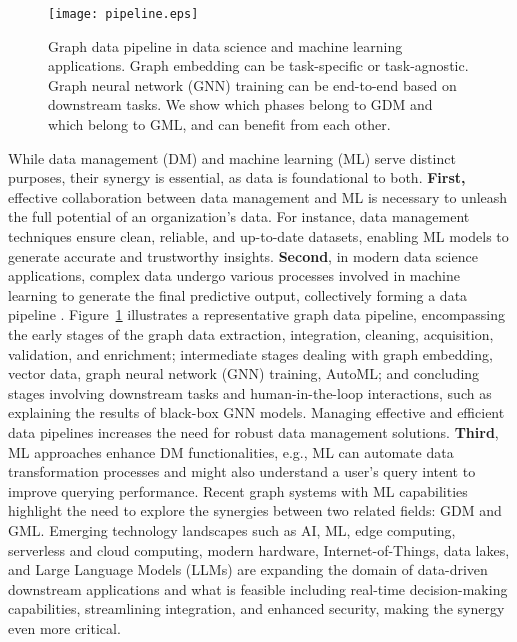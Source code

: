 \documentclass{sig-alternate-10pt}
\begin{document}
\begin{figure}[t!]
 \centering
 \texttt{[image: pipeline.eps]}
 \caption{Graph data pipeline in data science and machine learning applications. Graph embedding can be task-specific or task-agnostic. Graph neural network (GNN) training can be end-to-end based on downstream tasks. We show which phases belong to GDM and which belong to GML, and can benefit from each other.}
 \label{fig:pipeline}
 \vspace{-5mm}
\end{figure}

While data management (DM) and machine learning (ML) serve distinct purposes, their synergy is essential, as data is foundational to both.
{\bf First,} effective collaboration between data management and ML is necessary to unleash the full potential of an organization's data. For instance, data management techniques ensure clean, reliable, and up-to-date datasets, enabling ML models to generate accurate and trustworthy insights.
{\bf Second}, in modern data science applications, complex data undergo various processes involved in machine learning to generate the final predictive output, collectively forming a data pipeline \cite{Polyzotis0WZ17, Kumar0017}.
Figure~\ref{fig:pipeline} illustrates a representative graph data pipeline, encompassing the early stages of the graph data extraction, integration, cleaning, acquisition, validation, and enrichment;
intermediate stages dealing with graph embedding, vector data, graph neural network (GNN) training, AutoML;
and concluding stages involving downstream tasks and human-in-the-loop interactions, such as explaining the results of black-box GNN models.
Managing effective and efficient data pipelines increases the need for robust data management solutions.
{\bf Third}, ML approaches enhance DM functionalities, e.g., ML can automate data transformation processes and might also understand a user's query intent to improve querying performance.
Recent graph systems with ML capabilities \cite{abs-2303-14617,HorchidanC23,
Abdallah023} highlight the need to explore the synergies between two related fields: GDM and GML.
Emerging technology landscapes such as AI, ML, edge computing, serverless and cloud computing, modern hardware, Internet-of-Things, data lakes, and Large Language Models (LLMs) are expanding the domain of data-driven downstream applications and what is feasible including real-time decision-making capabilities, streamlining integration, and enhanced security, making the synergy even more critical.
\end{document}

